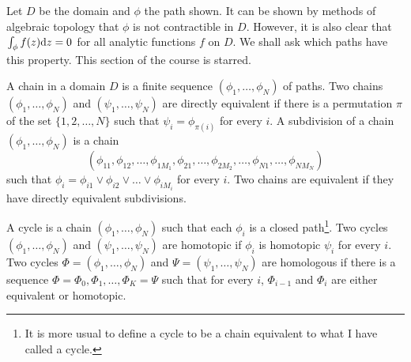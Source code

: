\documentclass{notes}
\theoremstyle{plain}
\begin{document}
\begin{figure}[h]
\begin{center}
\end{center}
\end{figure} 

Let $D$ be the domain and $\phi$ the path shown.  It can be shown by methods
of algebraic topology that $\phi$ is not contractible in $D$.  However, it
is also clear that $\int_\phi f(z) \mathrm{d} z = 0$ for all analytic functions $f$ on
$D$. We shall ask which paths have this property.  This section of the course
is starred.

A chain in a domain $D$ is a finite sequence
$( \phi_1, \dots, \phi_N )$ of paths.  Two chains
$( \phi_1, \dots, \phi_N )$ and $( \psi_1, \dots, \psi_N )$ are directly
equivalent if there is a permutation $\pi$ of the
set $\{ 1, 2, \dots, N \}$ such that $\psi_i = \phi_{\pi(i)}$ for every $i$.  A
subdivision of a chain
$( \phi_1, \dots, \phi_N )$ is a chain
\[
( \phi_{11}, \phi_{12}, \dots, \phi_{1 M_1}, \phi_{21}, \dots, \phi_{2 M_2},
\dots, \phi_{N 1}, \dots, \phi_{N M_N} )
\]
such that $\phi_i = \phi_{i 1} \vee \phi_{i 2} \vee \dots \vee \phi_{i M_i}$
for every $i$.  Two chains are equivalent if they
have directly equivalent subdivisions.

A cycle is a chain $( \phi_1, \dots, \phi_N )$ such that
each $\phi_i$ is a closed path\footnote{It is more usual to define a cycle to
be a chain equivalent to what I have called a cycle.}.  Two cycles 
$( \phi_1, \dots, \phi_N )$ and $( \psi_1, \dots, \psi_N )$ are homotopic %
 if
$\phi_i$ is homotopic $\psi_i$ for every $i$.  Two cycles
$\Phi = ( \phi_1, \dots, \phi_N )$ and $\Psi = ( \psi_1, \dots, \psi_N )$ are
homologous if there is a sequence
$\Phi = \Phi_0, \Phi_1, \dots, \Phi_K = \Psi$ such that for every $i$,
$\Phi_{i-1}$ and $\Phi_i$ are either equivalent or homotopic.
\end{document}
